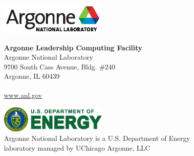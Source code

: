 \documentclass[11pt]{article}
\begin{document}


\vfill


\newpage
\pagestyle{empty}
\begin{minipage}[l]{\textwidth}
  \includegraphics[width=150pt]{ANL_CMYK.eps}
\end{minipage}
\vspace{0.3truein}

\hspace{0.7truein}
\begin{minipage}[l]{\textwidth}
  \textsf{\textbf{\Large{Argonne Leadership Computing Facility}}}\\
  \textsf{\large{
      Argonne National Laboratory\\
      9700 South Cass Avenue, Bldg. \#240\\
      Argonne, IL 60439\\
      \\
      \href{http://www.anl.gov}{www.anl.gov}\\
    }
  }
\end{minipage}
\vspace{4.65truein}

\hspace{0.7truein}
\begin{minipage}[l]{\textwidth}
  \includegraphics[width=150pt]{DOE_logo_color_cmyk.eps}\\
  \textsf{\scriptsize{
      Argonne National Laboratory is a U.S. Department of Energy\\
      laboratory managed by UChicago Argonne, LLC
    }
  }
\end{minipage}
\end{document}
